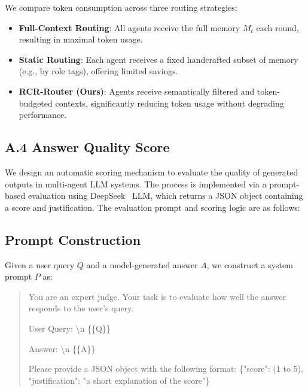 We compare token consumption across three routing strategies:
\begin{itemize}
    \item \textbf{Full-Context Routing}: All agents receive the full memory $M_t$ each round, resulting in maximal token usage.
    \item \textbf{Static Routing}: Each agent receives a fixed handcrafted subset of memory (e.g., by role tags), offering limited savings.
    \item \textbf{RCR-Router (Ours)}: Agents receive semantically filtered and token-budgeted contexts, significantly reducing token usage without degrading performance.
\end{itemize}


\subsection*{A.4  \quad Answer Quality Score}

We design an automatic scoring mechanism to evaluate the quality of generated outputs in multi-agent LLM systems. The process is implemented via a prompt-based evaluation using DeepSeek~\cite{liu2024deepseek,lu2024deepseek} LLM, which returns a JSON object containing a score and justification. The evaluation prompt and scoring logic are as follows:

\subsection*{Prompt Construction}

Given a user query $Q$ and a model-generated answer $A$, we construct a system prompt $P$ as:

\begin{quote}
You are an expert judge. Your task is to evaluate how well the answer responds to the user's query.

User Query: \textbackslash n
\{\{Q\}\}

Answer: \textbackslash n
\{\{A\}\}

Please provide a JSON object with the following format:
\{"score": (1 to 5), "justification": "a short explanation of the score"\}

\end{quote}

